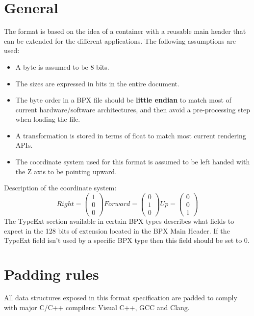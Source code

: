 \section{General}
The format is based on the idea of a container with a reusable main header that can be extended for the different applications.\newline
The following assumptions are used:
\begin{itemize}
    \item A byte is assumed to be 8 bits.
    \item The sizes are expressed in bits in the entire document.
    \item The byte order in a BPX file should be \textbf{little endian} to match most of current hardware/software architectures, and then avoid a pre-processing step when loading the file.
    \item A transformation is stored in terms of float to match most current rendering APIs.
    \item The coordinate system used for this format is assumed to be left handed with the Z axis to be pointing upward.
\end{itemize}
Description of the coordinate system:
\begin{equation}
    Right =
    \begin{pmatrix}
        1 \\
        0 \\
        0
    \end{pmatrix}
    Forward =
    \begin{pmatrix}
        0 \\
        1 \\
        0
    \end{pmatrix}
    Up =
    \begin{pmatrix}
        0 \\
        0 \\
        1
    \end{pmatrix}
\end{equation}
The TypeExt section available in certain BPX types describes what fields to expect in the 128 bits of extension located in the BPX Main Header.\newline
If the TypeExt field isn't used by a specific BPX type then this field should be set to 0.

\section{Padding rules}
All data structures exposed in this format specification are padded to comply with major C/C++ compilers: Visual C++, GCC and Clang.